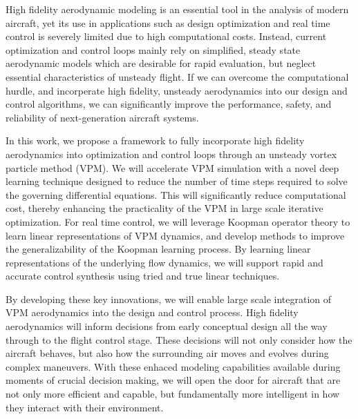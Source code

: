 \documentclass[12pt, letterpaper]{article}
\begin{document}



High fidelity aerodynamic modeling is an essential tool in the analysis of modern aircraft, yet its use in applications such as design optimization and real time control is severely limited due to high computational costs.  Instead, current optimization and control loops mainly rely on simplified, steady state aerodynamic models which are desirable for rapid evaluation, but neglect essential characteristics of unsteady flight. If we can overcome the computational hurdle, and incorperate high fidelity, unsteady aerodynamics into our design and control algorithms, we can significantly improve the performance, safety, and reliability of next-generation aircraft systems. 

In this work, we propose a framework to fully incorporate high fidelity aerodynamics into optimization and control loops through an unsteady vortex particle method (VPM).  We will accelerate VPM simulation with a novel deep learning technique designed to reduce the number of time steps required to solve the governing differential equations.  This will significantly reduce computational cost, thereby enhancing the practicality of the VPM in large scale iterative optimization.  For real time control, we will leverage Koopman operator theory to learn linear representations of VPM dynamics, and develop methods to improve the generalizability of the Koopman learning process.  By learning linear representations of the underlying flow dynamics, we will support rapid and accurate control synthesis using tried and true linear techniques.

By developing these key innovations, we will enable large scale integration of VPM aerodynamics into the design and control process.  High fidelity aerodynamics will inform decisions from early conceptual design all the way through to the flight control stage.  These decisions will not only consider how the aircraft behaves, but also how the surrounding air moves and evolves during complex maneuvers.  With these enhaced modeling capabilities available during moments of crucial decision making, we will open the door for aircraft that are not only more efficient and capable, but fundamentally more intelligent in how they interact with their environment. 
\end{document}

